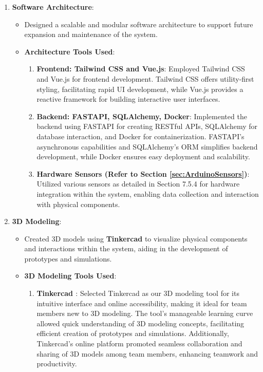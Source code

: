 \begin{enumerate}
    \item \textbf{Software Architecture}:
    \begin{itemize}
            \item Designed a scalable and modular software architecture to support future expansion and maintenance of the system.       
    \item \textbf{Architecture Tools Used}:
        \begin{enumerate}
            \item \textbf{Frontend: Tailwind CSS and Vue.js}: Employed Tailwind CSS and Vue.js for frontend development. Tailwind CSS offers utility-first styling, facilitating rapid UI development, while Vue.js provides a reactive framework for building interactive user interfaces.
            \item \textbf{Backend: FASTAPI, SQLAlchemy, Docker}: Implemented the backend using FASTAPI for creating RESTful APIs, SQLAlchemy for database interaction, and Docker for containerization. FASTAPI's asynchronous capabilities and SQLAlchemy's ORM simplifies backend development, while Docker ensures easy deployment and scalability.
            \item \textbf{Hardware Sensors (Refer to Section \ref{sec:ArduinoSensors})}: Utilized various sensors as detailed in Section 7.5.4 for hardware integration within the system, enabling data collection and interaction with physical components.
        \end{enumerate}
    \end{itemize}
    
    
    \item \textbf{3D Modeling}:
    \begin{itemize}
            \item Created 3D models using \textbf{Tinkercad} to visualize physical components and interactions within the system, aiding in the development of prototypes and simulations.
        \item \textbf{3D Modeling Tools Used}:
        \begin{enumerate}
            \item \textbf{Tinkercad \cite{tinkercad}}: Selected Tinkercad as our 3D modeling tool for its intuitive interface and online accessibility, making it ideal for team members new to 3D modeling. The tool's manageable learning curve allowed quick understanding of 3D modeling concepts, facilitating efficient creation of prototypes and simulations. Additionally, Tinkercad's online platform promoted seamless collaboration and sharing of 3D models among team members, enhancing teamwork and productivity.
        \end{enumerate}
    \end{itemize}
\end{enumerate}
   

